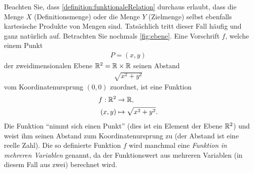 \noindent
Beachten Sie, dass \cref{definition:funktionaleRelation} durchaus erlaubt, dass die Menge $X$ (Definitionsmenge) oder die Menge $Y$ (Zielmenge) selbst ebenfalls kartesische Produkte von Mengen sind. Tatsächlich tritt dieser Fall häufig und ganz natürlich auf. Betrachten Sie nochmals \cref{fig:ebene}. Eine Vorschrift $f$, welche einem Punkt
\begin{align*}
    P = (x,y)
\end{align*}
der zweidimensionalen Ebene $\mathbb{R}^2 = \mathbb{R}\times\mathbb{R}$ seinen Abstand
\begin{align*}
    \sqrt{x^2 + y^2}
\end{align*}
vom Koordinatenursprung $(0,0)$ zuordnet, ist eine Funktion
\begin{align*}
    f: \mathbb{R}^2 &\to\mathbb{R},\\
    (x,y) &\mapsto \sqrt{x^2 + y^2}.
\end{align*}
Die Funktion \enquote{nimmt sich einen Punkt} (dies ist ein Element der Ebene $\mathbb{R}^2$) und weist ihm seinen Abstand zum Koordinatenursprung zu (der Abstand ist eine reelle Zahl). Die so definierte Funktion $f$ wird manchmal eine \textit{Funktion in mehreren Variablen} genannt, da der Funktionswert aus mehreren Variablen (in diesem Fall aus zwei) berechnet wird.

